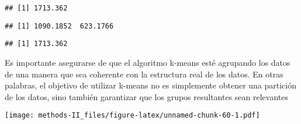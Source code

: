 \documentclass[
]{article}
\newenvironment{Shaded}{\begin{snugshade}}{\end{snugshade}}
\newcommand{\AttributeTok}[1]{\textcolor[rgb]{0.77,0.63,0.00}{#1}}
\newcommand{\DecValTok}[1]{\textcolor[rgb]{0.00,0.00,0.81}{#1}}
\newcommand{\FunctionTok}[1]{\textcolor[rgb]{0.00,0.00,0.00}{#1}}
\newcommand{\NormalTok}[1]{#1}
\newcommand{\SpecialCharTok}[1]{\textcolor[rgb]{0.00,0.00,0.00}{#1}}
\begin{document}
\begin{Shaded}
\end{Shaded}

\begin{verbatim}
## [1] 1713.362
\end{verbatim}

\begin{Shaded}
\end{Shaded}

\begin{verbatim}
## [1] 1090.1852  623.1766
\end{verbatim}

\begin{Shaded}
\end{Shaded}

\begin{verbatim}
## [1] 1713.362
\end{verbatim}

Es importante asegurarse de que el algoritmo k-means esté agrupando los
datos de una manera que sea coherente con la estructura real de los
datos. En otras palabras, el objetivo de utilizar k-means no es
simplemente obtener una partición de los datos, sino también garantizar
que los grupos resultantes sean relevantes

\begin{Shaded}
\end{Shaded}

\texttt{[image: methods-II\_files/figure-latex/unnamed-chunk-60-1.pdf]}
\end{document}
